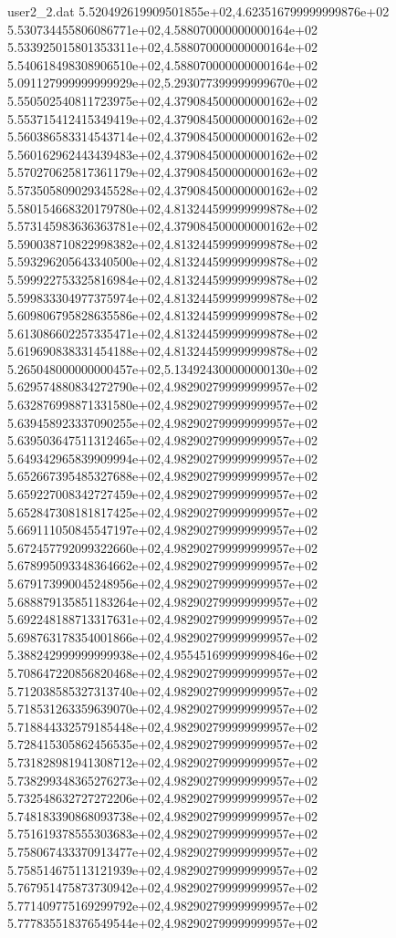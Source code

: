 \begin{filecontents}{user2_2.dat}
5.520492619909501855e+02,4.623516799999999876e+02
5.530734455806086771e+02,4.588070000000000164e+02
5.533925015801353311e+02,4.588070000000000164e+02
5.540618498308906510e+02,4.588070000000000164e+02
5.091127999999999929e+02,5.293077399999999670e+02
5.550502540811723975e+02,4.379084500000000162e+02
5.553715412415349419e+02,4.379084500000000162e+02
5.560386583314543714e+02,4.379084500000000162e+02
5.560162962443439483e+02,4.379084500000000162e+02
5.570270625817361179e+02,4.379084500000000162e+02
5.573505809029345528e+02,4.379084500000000162e+02
5.580154668320179780e+02,4.813244599999999878e+02
5.573145983636363781e+02,4.379084500000000162e+02
5.590038710822998382e+02,4.813244599999999878e+02
5.593296205643340500e+02,4.813244599999999878e+02
5.599922753325816984e+02,4.813244599999999878e+02
5.599833304977375974e+02,4.813244599999999878e+02
5.609806795828635586e+02,4.813244599999999878e+02
5.613086602257335471e+02,4.813244599999999878e+02
5.619690838331454188e+02,4.813244599999999878e+02
5.265048000000000457e+02,5.134924300000000130e+02
5.629574880834272790e+02,4.982902799999999957e+02
5.632876998871331580e+02,4.982902799999999957e+02
5.639458923337090255e+02,4.982902799999999957e+02
5.639503647511312465e+02,4.982902799999999957e+02
5.649342965839909994e+02,4.982902799999999957e+02
5.652667395485327688e+02,4.982902799999999957e+02
5.659227008342727459e+02,4.982902799999999957e+02
5.652847308181817425e+02,4.982902799999999957e+02
5.669111050845547197e+02,4.982902799999999957e+02
5.672457792099322660e+02,4.982902799999999957e+02
5.678995093348364662e+02,4.982902799999999957e+02
5.679173990045248956e+02,4.982902799999999957e+02
5.688879135851183264e+02,4.982902799999999957e+02
5.692248188713317631e+02,4.982902799999999957e+02
5.698763178354001866e+02,4.982902799999999957e+02
5.388242999999999938e+02,4.955451699999999846e+02
5.708647220856820468e+02,4.982902799999999957e+02
5.712038585327313740e+02,4.982902799999999957e+02
5.718531263359639070e+02,4.982902799999999957e+02
5.718844332579185448e+02,4.982902799999999957e+02
5.728415305862456535e+02,4.982902799999999957e+02
5.731828981941308712e+02,4.982902799999999957e+02
5.738299348365276273e+02,4.982902799999999957e+02
5.732548632727272206e+02,4.982902799999999957e+02
5.748183390868093738e+02,4.982902799999999957e+02
5.751619378555303683e+02,4.982902799999999957e+02
5.758067433370913477e+02,4.982902799999999957e+02
5.758514675113121939e+02,4.982902799999999957e+02
5.767951475873730942e+02,4.982902799999999957e+02
5.771409775169299792e+02,4.982902799999999957e+02
5.777835518376549544e+02,4.982902799999999957e+02

\end{filecontents}
